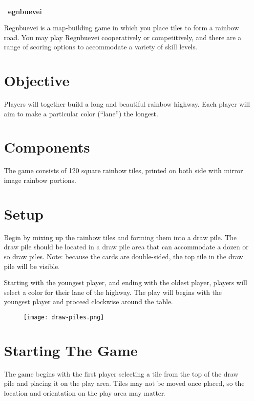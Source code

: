 \documentclass[twocolumn, 11pt]{article}
\begin{document}
{
  \textcolor{white}{.}\\
  \textcolor{white}{.}\Huge \bf\hspace{0.3em} egnbuevei
}

\vspace{1.7em}\noindent
Regnbuevei is a map-building game in which you place tiles to form a rainbow road.  You may play Regnbuevei cooperatively or competitively, and there are a range of scoring options to accommodate a variety of skill levels.

\section*{Objective}

Players will together build a long and beautiful rainbow highway.
Each player will aim to make a particular color (``lane'') the
longest.
\section*{Components}
The game consists of 120 square rainbow tiles, printed on both side
with mirror image rainbow portions.

\section*{Setup}

Begin by mixing up the rainbow tiles and forming them into a draw
pile. The draw pile should be located in a draw pile area that can
accommodate a dozen or so draw piles.  Note: because the cards are
double-sided, the top tile in the draw pile will be visible.

Starting with the youngest player, and ending with the oldest player,
players will select a color for their lane of the highway.  The play
will begins with the youngest player and proceed clockwise around the
table.
\begin{figure}[h]
  \texttt{[image: draw-piles.png]}
\end{figure}
\section*{Starting The Game}
The game begins with the first player selecting a tile from the top of
the draw pile and placing it on the play area.  Tiles may not be moved
once placed, so the location and orientation on the play area may
matter.
\end{document}
